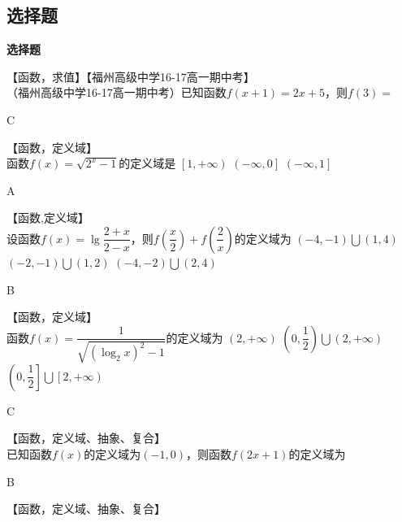   \subsection{选择题}\begin{exercise}{\bf 选择题}
    \item 【函数，求值】【福州高级中学16-17高一期中考】\\
      （福州高级中学16-17高一期中考）已知函数$f(x+1)=2x+5$，则$f(3)=$\xz
      \begin{answer}
        C
      \end{answer}
    \item 【函数，定义域】\\
      函数$f(x)=\sqrt{2^x-1}$的定义域是\xz
      \xx{$ \left[0,+\infty\right)$}
       {$ \left[1,+\infty\right)$}
       {$ \left(-\infty,0\right]$}
       {$ \left(-\infty,1\right]$}
      \begin{answer}
        A
      \end{answer}
    \item 【函数,定义域】\\
      设函数$f(x)=\lg \dfrac{2+x}{2-x}$，则$ f\left(\dfrac{x}{2}\right)+f\left(\dfrac{2}{x}\right) $的定义域为\xz
       {$\left(-4,-1\right)\bigcup \left(1,4\right) $}
       {$ \left(-2,-1\right)\bigcup \left(1,2\right)$}
       {$ \left(-4,-2\right)\bigcup \left(2,4\right)$}
      \begin{answer}
        B
      \end{answer}
    \item 【函数，定义域】\\
      函数$f(x)=\dfrac{1}{\sqrt{\left(\log_2x\right)^2-1}}$的定义域为\xz
       {$ \left(2,+\infty\right)$}
       {$ \left(0,\dfrac{1}{2}\right)\bigcup\left(2,+\infty\right)$}
       {$ \left(0,\dfrac{1}{2}\right]\bigcup\left[2,+\infty\right)$}
      \begin{answer}
        C
      \end{answer}
    \item 【函数，定义域、抽象、复合】\\
      已知函数$f(x)$的定义域为$(-1,0)$，则函数$f(2x+1)$的定义域为\xz
      \begin{answer}
        B
      \end{answer}
    \item 【函数，定义域、抽象、复合】\\

\end{exercise}
